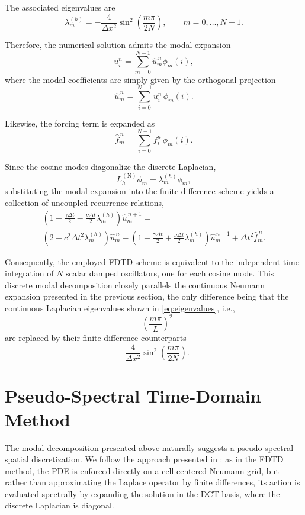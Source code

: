 \documentclass{Configuration_Files/PoliMi3i_thesis}
\begin{document}
The associated eigenvalues are
\begin{equation*}
\lambda_m^{(h)}
=
-\frac{4}{\Delta x^2}
\sin^2\!\left(
\frac{m\pi}{2N}
\right),
\qquad
m=0,\ldots,N-1.
\end{equation*}

Therefore, the numerical solution admits the modal expansion
\begin{equation*}
u_i^n
=
\sum_{m=0}^{N-1}
\widehat u_m^{\,n}\phi_m(i),
\end{equation*}
where the modal coefficients are simply given by the orthogonal projection
\begin{equation*}
\widehat u_m^{\,n}
=
\sum_{i=0}^{N-1}
u_i^n\,\phi_m(i).
\end{equation*}

Likewise, the forcing term is expanded as
\begin{equation*}
\widehat f_m^{\,n}
=
\sum_{i=0}^{N-1}
f_i^n\,\phi_m(i).
\end{equation*}

Since the cosine modes diagonalize the discrete Laplacian,
\begin{equation*}
L_h^{(\mathrm N)}\phi_m
=
\lambda_m^{(h)}\phi_m,
\end{equation*}
substituting the modal expansion into the finite-difference scheme yields a
collection of uncoupled recurrence relations,
\begin{multline}
\left(
1+\frac{\gamma\Delta t}{2}
-
\frac{\nu\Delta t}{2}
\lambda_m^{(h)}
\right)
\widehat u_m^{\,n+1}
= \\
\left(
2
+
c^2\Delta t^2
\lambda_m^{(h)}
\right)
\widehat u_m^{\,n}
-
\left(
1-\frac{\gamma\Delta t}{2}
+
\frac{\nu\Delta t}{2}
\lambda_m^{(h)}
\right)
\widehat u_m^{\,n-1}
+
\Delta t^2\widehat f_m^{\,n}.
\end{multline}

Consequently, the employed FDTD scheme is equivalent to the independent time integration of $N$ scalar damped oscillators, one for each cosine mode. This discrete modal decomposition closely parallels the continuous Neumann expansion presented in the previous section, the only difference being that the continuous Laplacian eigenvalues shown in \eqref{eq:eigenvalues}, i.e.,
\[
-\left(\frac{m\pi}{L}\right)^2
\]
are replaced by their finite-difference counterparts
\[
-\frac{4}{\Delta x^2}
\sin^2\!\left(\frac{m\pi}{2N}\right).
\]

\section{Pseudo-Spectral Time-Domain Method}
The modal decomposition presented above naturally suggests a pseudo-spectral spatial discretization. We follow the approach presented in \cite{raghuvanshi_efficient_2009}: as in the FDTD method, the PDE is enforced directly on a cell-centered Neumann grid, but rather than approximating the Laplace operator by finite differences, its action is evaluated spectrally by expanding the solution in the DCT basis, where the discrete Laplacian is diagonal.
\end{document}
